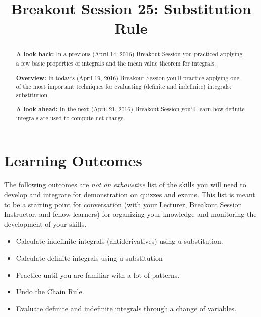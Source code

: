 \documentclass[handout, nooutcomes]{ximera}
\title{Breakout Session 25: Substitution Rule}
\begin{document}
\begin{abstract}
  \textbf{A look back:} In a previous (April 14, 2016) Breakout Session you practiced applying a few basic properties of integrals and the mean value theorem for integrals.

  \textbf{Overview:} In today's (April 19, 2016) Breakout Session you'll practice applying one of the most important techniques for evaluating (definite and indefinite) integrals: substitution.

  \textbf{A look ahead:} In the next (April 21, 2016) Breakout Session you'll learn how definite integrals are used to compute net change.
\end{abstract}
\maketitle

\section{Learning Outcomes}
\label{section:learning-outcomes}
The following outcomes are \emph{not an exhaustive} list of the skills you will need to develop and integrate for demonstration on quizzes and exams.
This list is meant to be a starting point for conversation (with your Lecturer, Breakout Session Instructor, and fellow learners) for organizing your knowledge and monitoring the development of your skills.

\begin{itemize}
  \item
    Calculate indefinite integrals (antiderivatives) using u-substitution.
  \item
    Calculate definite integrals using u-substitution
  \item
    Practice until you are familiar with a lot of patterns.
  \item
    Undo the Chain Rule.
  \item
    Evaluate definite and indefinite integrals through a change of variables.
\end{itemize}
\newpage
\end{document}
